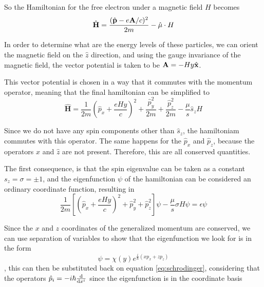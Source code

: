 \documentclass[prd,amsfonts,onecolumn,superscriptaddress,aps,nofootinbib,11pt]{revtex4}
\newcommand{\bhat}[1]{\hat{\mathbf{#1}}}
\begin{document}
So the Hamiltonian for the free electron under a magnetic field $H$ becomes
\begin{equation}
    \bhat{H} = \frac{(\bhat{p} - e\vb{A}/c)^2}{2 m} - \bhat{\mu}\cdot H
\end{equation}

In order to determine what are the energy levels of these particles, we can orient the magnetic field on the $\hat{z}$ direction, and using the gauge invariance of the magnetic field, the vector potential is taken to be $\vb{A}=-H y \bhat{x}$.

This vector potential is chosen in a way that it commutes with the momentum operator, meaning that the final hamiltonian can be simplified to 
\begin{equation}
    \bhat{H} = \frac{1}{2 m}\left(\hat{p}_x + \frac{e H y}{c}\right)^2 + \frac{\hat{p}_y^2}{2m} + \frac{\hat{p}_z^2}{2m} - \frac{\mu}{s}\hat{s}_z   H
\end{equation}



Since we do not have any spin components other than $\hat{s}_z$, the hamiltoniam commutes with this operator. The same happens for the $\hat{p}_x$ and $\hat{p}_z$, because the operators $\hat{x}$ and $\hat{z}$ are not present. Therefore, this are all conserved quantities. 

The first consequence, is that the spin eigenvalue can be taken as a constant $s_z = \sigma = \pm 1$, and the eigenfunction  $\psi$ of the hamiltonian can be considered an ordinary coordinate function, resulting in
\begin{equation}\label{eq:schrodinger}
    \frac{1}{2m} \left[ \left(\hat{p}_x + \frac{e H y}{c}\right)^2  + \hat{p}_y^2 + \hat{p}_z^2 \right]\psi - \frac{\mu}{s} \sigma H \psi = \epsilon \psi
\end{equation}

Since the $x$ and $z$ coordinates of the generalized momentum are conserved, we can use separation of variables to show that the eigenfunction we look for is in the form
\begin{equation}\label{eq:psi}
    \psi = \chi(y) e^{\frac{i}{\hbar}(x p_x + z p_z) }
\end{equation}
, this can then be substituted back on equation \ref{eq:schrodinger}, considering that the operators $\hat{p}_i = -i \hbar \dv{}{x^i}$ since the eigenfunction is in the coordinate basis
\end{document}
